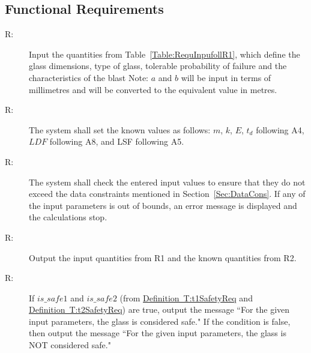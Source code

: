 \documentclass[12pt]{article}
\newcounter{reqnum}
\newcommand{\rthereqnum}{R\thereqnum}
\begin{document}
\subsection{Functional Requirements}
\label{Sec:FuncRequ}
\begin{description}
\item[\rthereqnum\label{R:s71req1}:]Input the quantities from Table~\ref{Table:RequInpufollR1}, which define the glass dimensions, type of glass, tolerable probability of failure and the characteristics of the blast Note: $a$ and $b$ will be input in terms of millimetres and will be converted to the equivalent value in metres.
\end{description}
\begin{description}
\item[\rthereqnum\label{R:s71req2}:]The system shall set the known values as follows: $m$, $k$, $E$, ${t_{d}}$ following A4, $LDF$ following A8, and LSF following A5.
\end{description}
\begin{description}
\item[\rthereqnum\label{R:s71req3}:]The system shall check the entered input values to ensure that they do not exceed the data constraints mentioned in Section~\ref{Sec:DataCons}. If any of the input parameters is out of bounds, an error message is displayed and the calculations stop.
\end{description}
\begin{description}
\item[\rthereqnum\label{R:s71req4}:]Output the input quantities from R1 and the known quantities from R2.
\end{description}
\begin{description}
\item[\rthereqnum\label{R:s71req5}:]If $is\_safe1$ and $is\_safe2$ (from \hyperref[T:t1SafetyReq]{Definition~T:t1SafetyReq} and \hyperref[T:t2SafetyReq]{Definition~T:t2SafetyReq}) are true, output the message ``For the given input parameters, the glass is considered safe." If the condition is false, then output the message ``For the given input parameters, the glass is NOT considered safe."
\end{description}
\end{document}
